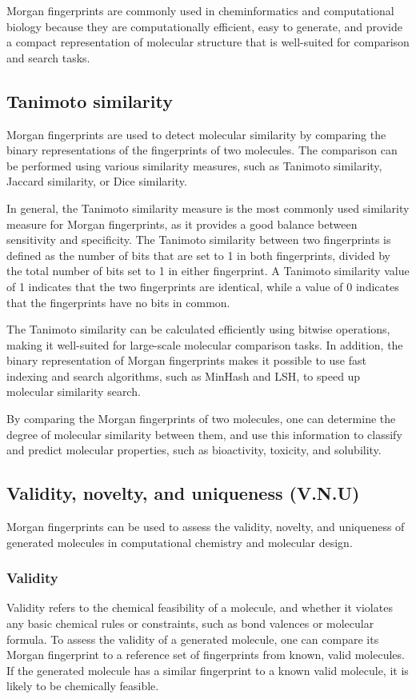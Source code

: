 Morgan fingerprints are commonly used in cheminformatics and computational biology because they are computationally efficient, easy to generate, and provide a compact representation of molecular structure that is well-suited for comparison and search tasks.

\subsection{Tanimoto similarity}
Morgan fingerprints are used to detect molecular similarity by comparing the binary representations of the fingerprints of two molecules. The comparison can be performed using various similarity measures, such as Tanimoto similarity, Jaccard similarity, or Dice similarity.

In general, the Tanimoto similarity measure is the most commonly used similarity measure for Morgan fingerprints, as it provides a good balance between sensitivity and specificity. The Tanimoto similarity between two fingerprints is defined as the number of bits that are set to 1 in both fingerprints, divided by the total number of bits set to 1 in either fingerprint. A Tanimoto similarity value of 1 indicates that the two fingerprints are identical, while a value of 0 indicates that the fingerprints have no bits in common.

The Tanimoto similarity can be calculated efficiently using bitwise operations, making it well-suited for large-scale molecular comparison tasks. In addition, the binary representation of Morgan fingerprints makes it possible to use fast indexing and search algorithms, such as MinHash and LSH, to speed up molecular similarity search.

By comparing the Morgan fingerprints of two molecules, one can determine the degree of molecular similarity between them, and use this information to classify and predict molecular properties, such as bioactivity, toxicity, and solubility.

\subsection{Validity, novelty, and uniqueness (V.N.U)}
Morgan fingerprints can be used to assess the validity, novelty, and uniqueness of generated molecules in computational chemistry and molecular design.

\subsubsection{Validity}
Validity refers to the chemical feasibility of a molecule, and whether it violates any basic chemical rules or constraints, such as bond valences or molecular formula. To assess the validity of a generated molecule, one can compare its Morgan fingerprint to a reference set of fingerprints from known, valid molecules. If the generated molecule has a similar fingerprint to a known valid molecule, it is likely to be chemically feasible.

